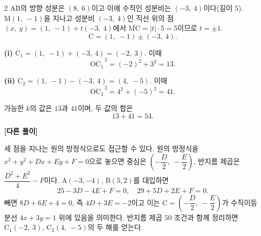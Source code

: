 \documentclass[10pt,fleqn]{article}
\renewcommand{\solpart}[1]{%
  \par\addvspace{10pt}\noindent
  {\sffamily\bfseries\color{black}(#1)}\hspace{3mm}\ignorespaces%
}
\newcommand{\solalt}{%
  \par\addvspace{8pt}\noindent
  \textcolor{gjAltGray}{\sffamily\bfseries [다른 풀이]}\quad\ignorespaces%
}
\begin{document}
\begin{multicols}{2}
$\overline{\mathrm{AB}}$의 방향 성분은 $(8,\ 6)$이고 이에 수직인 성분비는 $(-3,\ 4)$이다(길이 $5$). $\mathrm{M}(1,\ -1)$을 지나고 성분비 $(-3,\ 4)$인 직선 위의 점 $(x,\ y) = (1,\ -1) + t(-3,\ 4)$에서 $\overline{\mathrm{MC}} = |t| \cdot 5 = 5$이므로 $t = \pm 1$.
\[ \mathrm{C} = (1,\ -1) \pm (-3,\ 4). \]

\solpart{i} $\mathrm{C}_{1} = (1,\ -1) + (-3,\ 4) = (-2,\ 3)$. 이때
\[ \overline{\mathrm{OC}_{1}}^{\,2} = (-2)^{2} + 3^{2} = 13. \]

\solpart{ii} $\mathrm{C}_{2} = (1,\ -1) - (-3,\ 4) = (4,\ -5)$. 이때
\[ \overline{\mathrm{OC}_{2}}^{\,2} = 4^{2} + (-5)^{2} = 41. \]

가능한 $k$의 값은 $13$과 $41$이며, 두 값의 합은
\[ 13 + 41 = 54. \]

\solalt
세 점을 지나는 원의 방정식으로도 접근할 수 있다. 원의 방정식을 $x^{2} + y^{2} + Dx + Ey + F = 0$으로 놓으면 중심은 $\left(-\dfrac{D}{2},\ -\dfrac{E}{2}\right)$, 반지름 제곱은 $\dfrac{D^{2} + E^{2}}{4} - F$이다. $\mathrm{A}(-3, -4)$, $\mathrm{B}(5, 2)$를 대입하면
\[ 25 - 3D - 4E + F = 0,\quad 29 + 5D + 2E + F = 0. \]
빼면 $8D + 6E + 4 = 0$, 즉 $4D + 3E = -2$이고 이는 $\mathrm{C} = \left(-\dfrac{D}{2},\ -\dfrac{E}{2}\right)$가 수직이등분선 $4x + 3y = 1$ 위에 있음을 의미한다. 반지름 제곱 $50$ 조건과 함께 정리하면 $\mathrm{C}_{1}(-2,\ 3)$, $\mathrm{C}_{2}(4,\ -5)$의 두 해를 얻는다.


\columnbreak
\null
\end{multicols}
\end{document}
